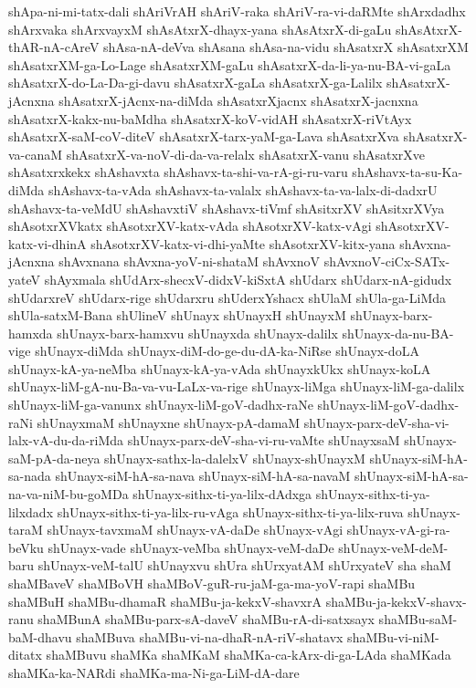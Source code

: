 {shApa-ni-mi-tatx-dali
shAriVrAH
shAriV-raka
shAriV-ra-vi-daRMte
shArxdadhx
shArxvaka
shArxvayxM
shAsAtxrX-dhayx-yana
shAsAtxrX-di-gaLu
shAsAtxrX-thAR-nA-cAreV
shAsa-nA-deVva
shAsana
shAsa-na-vidu
shAsatxrX
shAsatxrXM
shAsatxrXM-ga-Lo-Lage
shAsatxrXM-gaLu
shAsatxrX-da-li-ya-nu-BA-vi-gaLa
shAsatxrX-do-La-Da-gi-davu
shAsatxrX-gaLa
shAsatxrX-ga-Lalilx
shAsatxrX-jAcnxna
shAsatxrX-jAcnx-na-diMda
shAsatxrXjacnx
shAsatxrX-jacnxna
shAsatxrX-kakx-nu-baMdha
shAsatxrX-koV-vidAH
shAsatxrX-riVtAyx
shAsatxrX-saM-coV-diteV
shAsatxrX-tarx-yaM-ga-Lava
shAsatxrXva
shAsatxrX-va-canaM
shAsatxrX-va-noV-di-da-va-relalx
shAsatxrX-vanu
shAsatxrXve
shAsatxrxkekx
shAshavxta
shAshavx-ta-shi-va-rA-gi-ru-varu
shAshavx-ta-su-Ka-diMda
shAshavx-ta-vAda
shAshavx-ta-valalx
shAshavx-ta-va-lalx-di-dadxrU
shAshavx-ta-veMdU
shAshavxtiV
shAshavx-tiVmf
shAsitxrXV
shAsitxrXVya
shAsotxrXVkatx
shAsotxrXV-katx-vAda
shAsotxrXV-katx-vAgi
shAsotxrXV-katx-vi-dhinA
shAsotxrXV-katx-vi-dhi-yaMte
shAsotxrXV-kitx-yana
shAvxna-jAcnxna
shAvxnana
shAvxna-yoV-ni-shataM
shAvxnoV
shAvxnoV-ciCx-SATx-yateV
shAyxmala
shUdArx-shecxV-didxV-kiSxtA
shUdarx
shUdarx-nA-gidudx
shUdarxreV
shUdarx-rige
shUdarxru
shUderxYshacx
shUlaM
shUla-ga-LiMda
shUla-satxM-Bana
shUlineV
shUnayx
shUnayxH
shUnayxM
shUnayx-barx-hamxda
shUnayx-barx-hamxvu
shUnayxda
shUnayx-dalilx
shUnayx-da-nu-BA-vige
shUnayx-diMda
shUnayx-diM-do-ge-du-dA-ka-NiRse
shUnayx-doLA
shUnayx-kA-ya-neMba
shUnayx-kA-ya-vAda
shUnayxkUkx
shUnayx-koLA
shUnayx-liM-gA-nu-Ba-va-vu-LaLx-va-rige
shUnayx-liMga
shUnayx-liM-ga-dalilx
shUnayx-liM-ga-vanunx
shUnayx-liM-goV-dadhx-raNe
shUnayx-liM-goV-dadhx-raNi
shUnayxmaM
shUnayxne
shUnayx-pA-damaM
shUnayx-parx-deV-sha-vi-lalx-vA-du-da-riMda
shUnayx-parx-deV-sha-vi-ru-vaMte
shUnayxsaM
shUnayx-saM-pA-da-neya
shUnayx-sathx-la-dalelxV
shUnayx-shUnayxM
shUnayx-siM-hA-sa-nada
shUnayx-siM-hA-sa-nava
shUnayx-siM-hA-sa-navaM
shUnayx-siM-hA-sa-na-va-niM-bu-goMDa
shUnayx-sithx-ti-ya-lilx-dAdxga
shUnayx-sithx-ti-ya-lilxdadx
shUnayx-sithx-ti-ya-lilx-ru-vAga
shUnayx-sithx-ti-ya-lilx-ruva
shUnayx-taraM
shUnayx-tavxmaM
shUnayx-vA-daDe
shUnayx-vAgi
shUnayx-vA-gi-ra-beVku
shUnayx-vade
shUnayx-veMba
shUnayx-veM-daDe
shUnayx-veM-deM-baru
shUnayx-veM-talU
shUnayxvu
shUra
shUrxyatAM
shUrxyateV
sha
shaM
shaMBaveV
shaMBoVH
shaMBoV-guR-ru-jaM-ga-ma-yoV-rapi
shaMBu
shaMBuH
shaMBu-dhamaR
shaMBu-ja-kekxV-shavxrA
shaMBu-ja-kekxV-shavx-ranu
shaMBunA
shaMBu-parx-sA-daveV
shaMBu-rA-di-satxsayx
shaMBu-saM-baM-dhavu
shaMBuva
shaMBu-vi-na-dhaR-nA-riV-shatavx
shaMBu-vi-niM-ditatx
shaMBuvu
shaMKa
shaMKaM
shaMKa-ca-kArx-di-ga-LAda
shaMKada
shaMKa-ka-NARdi
shaMKa-ma-Ni-ga-LiM-dA-dare
}
